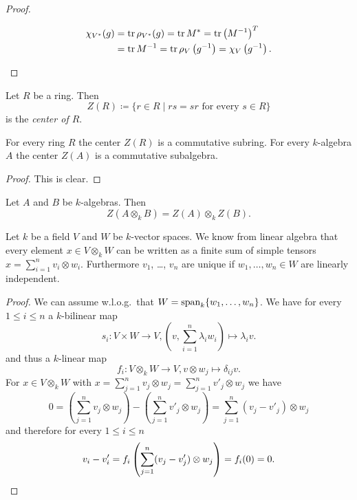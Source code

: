 \begin{proof}
\begin{enumerate}[label=\emph{\alph*)},leftmargin=*]
   \begin{align*}
    \chi_{V^*}(g)
    &= \operatorname{tr} \rho_{V^*}(g)
    = \operatorname{tr} M^*
    = \operatorname{tr} \left(M^{-1}\right)^T \\
    &= \operatorname{tr} M^{-1}
    = \operatorname{tr} \rho_V\left( g^{-1} \right)
    = \chi_V\left( g^{-1} \right).
    \qedhere
   \end{align*}
 \end{enumerate}
\end{proof}


\begin{defi}
 Let $R$ be a ring. Then
 \[
  Z(R) \coloneqq \{r \in R \mid rs = sr \text{ for every } s \in R\}
 \]
 is the \emph{center of $R$}.
\end{defi}


\begin{lem}
 For every ring $R$ the center $Z(R)$ is a commutative subring. For every $k$-algebra $A$ the center $Z(A)$ is a commutative subalgebra.
\end{lem}
\begin{proof}
 This is clear.
\end{proof}


\begin{lem}\label{lem: Z(A o B) = Z(A) o Z(B)}
 Let $A$ and $B$ be $k$-algebras. Then
 \[
  Z(A \otimes_k B) = Z(A) \otimes_k Z(B).
 \]
\end{lem}


\begin{rec}
 Let $k$ be a field $V$ and $W$ be $k$-vector spaces. We know from linear algebra that every element $x \in V \otimes_k W$ can be written as a finite sum of simple tensors $x = \sum_{i=1}^n v_i \otimes w_i$. Furthermore $v_1$, \dots, $v_n$ are unique if $w_1, \dotsc, w_n \in W$ are linearly independent.
 \begin{proof}
  We can assume w.l.o.g.\ that $W = \operatorname{span}_k \{w_1, \dotsc, w_n\}$. We have for every $1 \leq i \leq n$ a $k$-bilinear map
  \[
   s_i \colon V \times W \to V, \left(v, \sum_{i=1}^n \lambda_i w_i\right) \mapsto \lambda_i v.
  \]
  and thus a $k$-linear map
  \[
   f_i \colon V \otimes_k W \to V, v \otimes w_j \mapsto \delta_{ij} v.
  \]
  For $x \in V \otimes_k W$ with $x = \sum_{j=1}^n v_j \otimes w_j = \sum_{j=1}^n v'_j \otimes w_j$ we have
  \[
   0
   = \left( \sum_{j=1}^n v_j \otimes w_j \right) - \left( \sum_{j=1}^n v'_j \otimes w_j \right)
   = \sum_{j=1}^n (v_j - v'_j) \otimes w_j
  \]
  and therefore for every $1 \leq i \leq n$
  \[
   v_i - v'_i = f_i\left( \sum_{j=1}^n (v_j - v'_j) \otimes w_j\right) = f_i(0) = 0.
   \qedhere
  \]
 \end{proof}
\end{rec}


